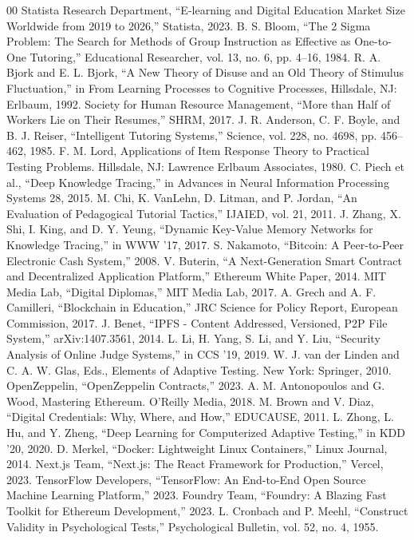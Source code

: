 \documentclass[conference]{IEEEtran}
\begin{document}
\begin{thebibliography}{00}
 Statista Research Department, ``E-learning and Digital Education Market Size Worldwide from 2019 to 2026,'' Statista, 2023.
 B. S. Bloom, ``The 2 Sigma Problem: The Search for Methods of Group Instruction as Effective as One-to-One Tutoring,'' Educational Researcher, vol. 13, no. 6, pp. 4--16, 1984.
 R. A. Bjork and E. L. Bjork, ``A New Theory of Disuse and an Old Theory of Stimulus Fluctuation,'' in From Learning Processes to Cognitive Processes, Hillsdale, NJ: Erlbaum, 1992.
 Society for Human Resource Management, ``More than Half of Workers Lie on Their Resumes,'' SHRM, 2017.
 J. R. Anderson, C. F. Boyle, and B. J. Reiser, ``Intelligent Tutoring Systems,'' Science, vol. 228, no. 4698, pp. 456--462, 1985.
 F. M. Lord, Applications of Item Response Theory to Practical Testing Problems. Hillsdale, NJ: Lawrence Erlbaum Associates, 1980.
 C. Piech et al., ``Deep Knowledge Tracing,'' in Advances in Neural Information Processing Systems 28, 2015.
 M. Chi, K. VanLehn, D. Litman, and P. Jordan, ``An Evaluation of Pedagogical Tutorial Tactics,'' IJAIED, vol. 21, 2011.
 J. Zhang, X. Shi, I. King, and D. Y. Yeung, ``Dynamic Key-Value Memory Networks for Knowledge Tracing,'' in WWW '17, 2017.
 S. Nakamoto, ``Bitcoin: A Peer-to-Peer Electronic Cash System,'' 2008.
 V. Buterin, ``A Next-Generation Smart Contract and Decentralized Application Platform,'' Ethereum White Paper, 2014.
 MIT Media Lab, ``Digital Diplomas,'' MIT Media Lab, 2017.
 A. Grech and A. F. Camilleri, ``Blockchain in Education,'' JRC Science for Policy Report, European Commission, 2017.
 J. Benet, ``IPFS - Content Addressed, Versioned, P2P File System,'' arXiv:1407.3561, 2014.
 L. Li, H. Yang, S. Li, and Y. Liu, ``Security Analysis of Online Judge Systems,'' in CCS '19, 2019.
 W. J. van der Linden and C. A. W. Glas, Eds., Elements of Adaptive Testing. New York: Springer, 2010.
 OpenZeppelin, ``OpenZeppelin Contracts,'' 2023.
 A. M. Antonopoulos and G. Wood, Mastering Ethereum. O'Reilly Media, 2018.
 M. Brown and V. Diaz, ``Digital Credentials: Why, Where, and How,'' EDUCAUSE, 2011.
 L. Zhong, L. Hu, and Y. Zheng, ``Deep Learning for Computerized Adaptive Testing,'' in KDD '20, 2020.
 D. Merkel, ``Docker: Lightweight Linux Containers,'' Linux Journal, 2014.
 Next.js Team, ``Next.js: The React Framework for Production,'' Vercel, 2023.
 TensorFlow Developers, ``TensorFlow: An End-to-End Open Source Machine Learning Platform,'' 2023.
 Foundry Team, ``Foundry: A Blazing Fast Toolkit for Ethereum Development,'' 2023.
 L. Cronbach and P. Meehl, ``Construct Validity in Psychological Tests,'' Psychological Bulletin, vol. 52, no. 4, 1955.
\end{thebibliography}
\end{document}
